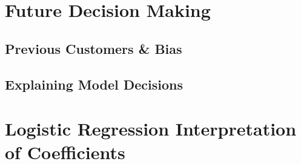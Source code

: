 \documentclass[12pt]{article}
\begin{document}
	
	\section{Future Decision Making}
	
	\subsection{Previous Customers \& Bias}
	
	\subsection{Explaining Model Decisions}
	
	
	\appendix 
	
	\section{Logistic Regression Interpretation of Coefficients}
	
	
	
\end{document}
